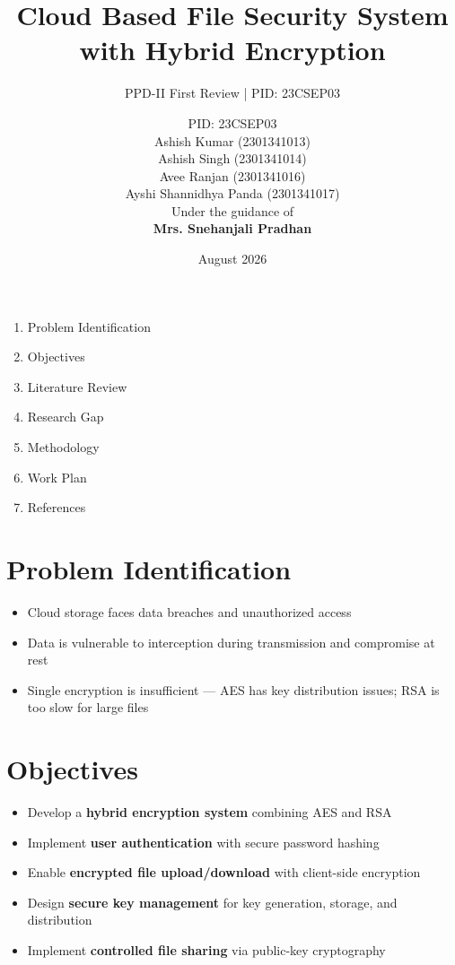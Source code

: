 \documentclass{SKP-beamer}
\title[Cloud File Security]{Cloud Based File Security System with Hybrid Encryption}
\subtitle{PPD-II First Review \hspace{0.3cm} | \hspace{0.3cm} PID: 23CSEP03}
\author[23CSEP03]{PID: 23CSEP03 \\[0.3cm] \small{Ashish Kumar (2301341013)} \\[0.1cm] \small{Ashish Singh (2301341014)} \\[0.1cm] \small{Avee Ranjan (2301341016)} \\[0.1cm] \small{Ayshi Shannidhya Panda (2301341017)} \\[0.3cm] \small{Under the guidance of} \\ \textbf{Mrs. Snehanjali Pradhan}}
\institute[SIT]{
  Silicon Institute of Technology
}
\date{August 2026}
\begin{document}
\begin{frame}
  \titlepage
\end{frame}

\begin{frame}{}
\begin{enumerate}
  \item Problem Identification
  \item Objectives
  \item Literature Review
  \item Research Gap
  \item Methodology
  \item Work Plan
  \item References
\end{enumerate}
\end{frame}

\section{Problem Identification}
\begin{frame}{}
\begin{itemize}
  \item Cloud storage faces \alert{data breaches} and unauthorized access
  \item Data is vulnerable to interception during transmission and compromise at rest
  \item Single encryption is insufficient --- AES has key distribution issues; RSA is too slow for large files
\end{itemize}
\end{frame}

\section{Objectives}
\begin{frame}{}
\begin{itemize}
  \item Develop a \textbf{hybrid encryption system} combining AES and RSA
  \item Implement \textbf{user authentication} with secure password hashing
  \item Enable \textbf{encrypted file upload/download} with client-side encryption
  \item Design \textbf{secure key management} for key generation, storage, and distribution
  \item Implement \textbf{controlled file sharing} via public-key cryptography
\end{itemize}
\end{frame}
\end{document}
